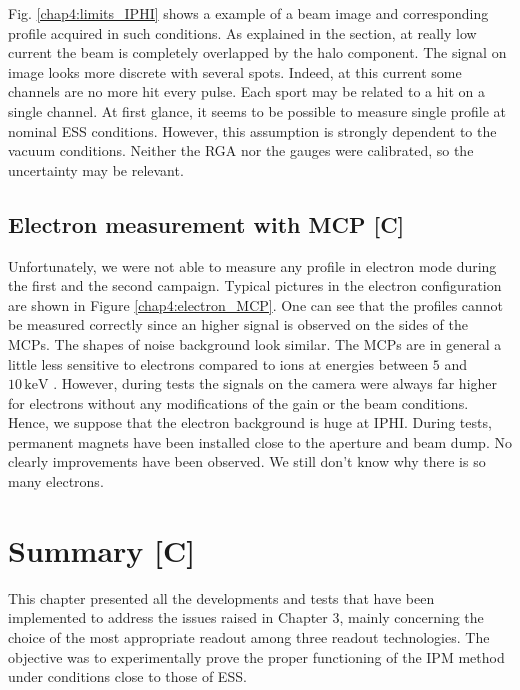 \begin{refsection}
  Fig. \ref{chap4:limits_IPHI} shows a example of a beam image and corresponding profile acquired in such conditions. As explained in the section, at really low current the beam is completely overlapped by the halo component. The signal on image looks more discrete with several spots. Indeed, at this current some channels are no more hit every pulse. Each sport may be related to a hit on a single channel.
  At first glance, it seems to be possible to measure single profile at nominal ESS conditions. However, this assumption is strongly dependent to the vacuum conditions. Neither the RGA nor the gauges were calibrated, so the uncertainty may be relevant.

  

  \subsection{Electron measurement with MCP [C]}
  Unfortunately, we were not able to measure any profile in electron mode during the first and the second campaign.
  Typical pictures in the electron configuration are shown in Figure \ref{chap4:electron_MCP}. One can see that the profiles cannot be measured correctly since an higher signal is observed on the sides of the MCPs. The shapes of noise background look similar.
  The MCPs are in general a little less sensitive to electrons compared to ions at energies between $5$ and $10\,\mathrm{keV}$ \cite{Wiza1979}.
  However, during tests the signals on the camera were always far higher for electrons without any modifications of the gain or the beam conditions.
  Hence, we suppose that the electron background is huge at IPHI.
  During tests, permanent magnets have been installed close to the aperture and beam dump. No clearly improvements have been observed. We still don't know why there is so many electrons.
  

  \section{Summary [C]}
  \label{ch4:Summary}
  This chapter presented all the developments and tests that have been implemented to address the issues raised in Chapter 3, mainly concerning the choice of the most appropriate readout among three readout technologies. The objective was to experimentally prove the proper functioning of the IPM method under conditions close to those of ESS.


\end{refsection}
